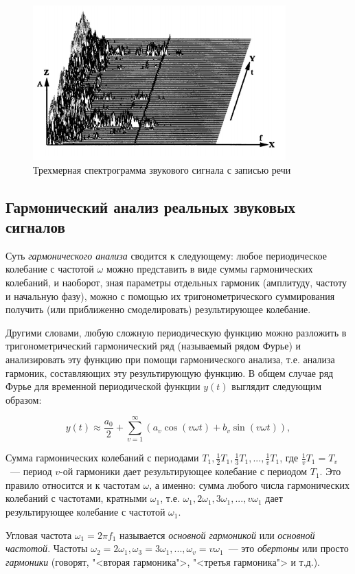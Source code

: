 \documentclass[oneside, final, 14pt]{extreport}
\begin{document}
\begin{figure}[h]
\centering
\includegraphics{pic-specter-03}
\caption{Трехмерная спектрограмма звукового сигнала с записью речи}
\label{pic-specter-03}
\end{figure}

\subsection{Гармонический анализ реальных звуковых сигналов}
Суть {\itshape гармонического анализа} сводится к следующему: любое периодическое колебание с частотой \(\omega\) можно представить в виде суммы гармонических колебаний, и наоборот, зная параметры отдельных гармоник (амплитуду, частоту и начальную фазу), можно с помощью их тригонометрического суммирования получить (или приближенно смоделировать) результирующее колебание.

Другими словами, любую сложную периодическую функцию можно разложить в тригонометрический гармонический ряд (называемый рядом Фурье) и анализировать эту функцию при помощи гармонического анализа, т.е. анализа гармоник, составляющих эту результирующую функцию. В общем случае ряд Фурье для временной периодической функции \(y(t)\) выглядит следующим образом:

\[ y(t) \approx \frac{a_0}{2} + \sum\limits_{v=1}^{\infty}(a_v\cos(v\omega t) + b_v\sin(v\omega t)),\]

Сумма гармонических колебаний с периодами \(T_1, \frac{1}{2}T_1, \frac{1}{3}T_1,...,\frac{1}{v}T_1\), где \(\frac{1}{v}T_1=T_v\)~--- период \(v\)-ой гармоники дает результирующее колебание с периодом \(T_1\). Это правило относится и к частотам \(\omega\), а именно: сумма любого числа гармонических колебаний с частотами, кратными \(\omega_1\), т.е. \(\omega_1, 2\omega_1,3\omega_1,...,v\omega_1\) дает результирующее колебание с частотой \(\omega_1\).

Угловая частота \(\omega_1=2\pi f_1\) называется {\itshape основной гармоникой} или {\itshape основной частотой}.
Частоты \(\omega_2=2\omega_1, \omega_3=3\omega_1,...,\omega_v=v\omega_1\)~--- это {\itshape обертоны} или просто {\itshape гармоники} (говорят, "<вторая гармоника">, "<третья гармоника"> и т.д.).
\end{document}
